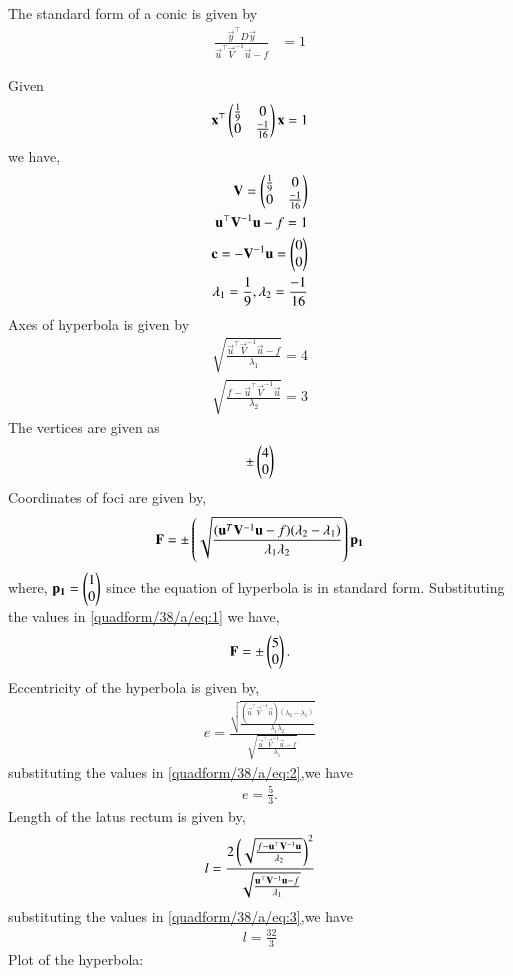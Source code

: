 
\begin{lemma}
The standard form of a conic is given by
\begin{align}
\frac{\vec{y}^{\top}D\vec{y}}{\vec{u}^{\top}\vec{V}^{-1}\vec{u}-f}&=1
\end{align}
\end{lemma}
Given
\begin{align}
\mathbf{x}^{\top}\begin{pmatrix}\frac{1}{9} & 0 \\ 0 &\frac{-1}{16} \end{pmatrix}\mathbf{x}=1  
\end{align}
we have,
\begin{align}
    \mathbf{V} = \begin{pmatrix}\frac{1}{9} & 0 \\ 0 &\frac{-1}{16} \end{pmatrix}
    \\
    \mathbf{u}^{\top}\mathbf{V}^{-1}\mathbf{u}-f = 1
    \\
    \mathbf{c} = -\mathbf{V}^{-1}\mathbf{u}=\begin{pmatrix}0 \\ 0\end{pmatrix}
    \\
    \lambda_1 =  \frac{1}{9}, \lambda_2 = \frac{-1}{16}
\end{align}
Axes of hyperbola is given by
\begin{align}
    \sqrt{\frac{\vec{u}^{\top}\vec{V}^{-1}\vec{u}-f}{\lambda_1}} = 4\\ \sqrt{\frac{f-\vec{u}^{\top}\vec{V}^{-1}\vec{u}}{\lambda_2}} = 3
\end{align}
The vertices are given as
\begin{align}
    \pm\begin{pmatrix}4 \\ 0\end{pmatrix}
\end{align}
Coordinates of foci are given by,
\begin{align}
  \mathbf{F} =\pm\left(\sqrt{\frac{(\mathbf{u}^T\mathbf{V}^{-1}\mathbf{u}-f)(\lambda_2-\lambda_1)}{\lambda_1\lambda_2}}\right)\mathbf{p_1} \label{quadform/38/a/eq:1}
\end{align}
where, $\mathbf{p_1} = \begin{pmatrix}1 \\ 0\end{pmatrix}$ since the equation of hyperbola is in standard form.
Substituting the values in \eqref{quadform/38/a/eq:1} we have,
\begin{align}
    \mathbf{F} = \pm\begin{pmatrix} 5 \\ 0\end{pmatrix}.
\end{align}
Eccentricity of the hyperbola is given by,
\begin{align}
   e = \frac{\sqrt{\frac{(\vec{u}^{\top}\vec{V}^{-1}\vec{u})(\lambda_2-\lambda_1)}{\lambda_1\lambda_2}}}{\sqrt{\frac{\vec{u}^{\top}\vec{V}^{-1}\vec{u}-f}{\lambda_1}}} \label{quadform/38/a/eq:2}
\end{align}
substituting the values in \eqref{quadform/38/a/eq:2},we have
\begin{align}
   e = \frac{5}{3}.
\end{align}
Length of the latus rectum is given by,
\begin{align}
    l = \frac{2\left({\sqrt{\frac{f-\mathbf{u}^{\top}\mathbf{V}^{-1}\mathbf{u}}{\lambda_2}}}\right)^2}{\sqrt{\frac{\mathbf{u}^{\top}\mathbf{V}^{-1}\mathbf{u}-f}{\lambda_1}}} \label{quadform/38/a/eq:3}
\end{align}
substituting the values in \eqref{quadform/38/a/eq:3},we have
\begin{align}
   l = \frac{32}{3}
\end{align}
Plot of the hyperbola:

